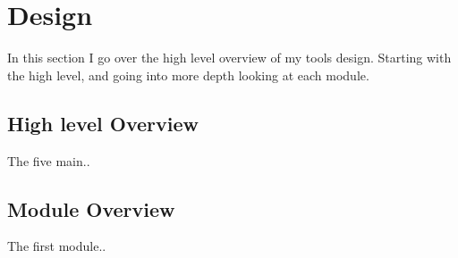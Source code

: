 \section{Design}
\label{sec:design}

In this section I go over the high level overview of my tools design. Starting with the high level, and going into more depth looking at each module.

\subsection{High level Overview}
\label{subsec:high_level_overview}

The five main..

\subsection{Module Overview}
\label{subsec:module_overview}

The first module..